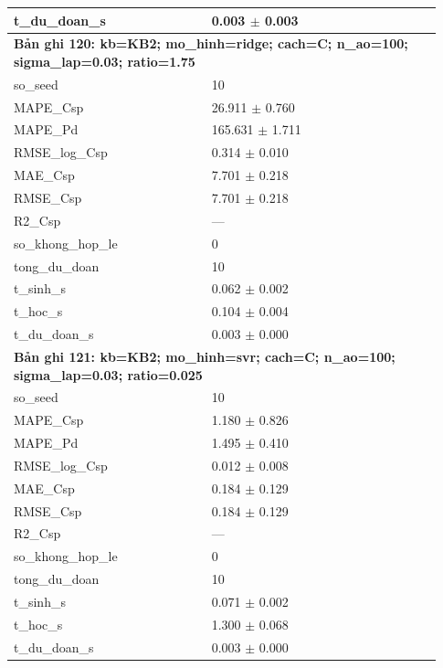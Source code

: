 \begin{longtable}{p{0.43\linewidth}p{0.50\linewidth}}
t\_\allowbreak du\_\allowbreak doan\_\allowbreak s & 0.003 $\pm$ 0.003 \\
\midrule
\multicolumn{2}{p{0.95\linewidth}}{\textbf{Bản ghi 120: kb=KB2; mo\_hinh=ridge; cach=C; n\_ao=100; sigma\_lap=0.03; ratio=1.75}} \\
so\_\allowbreak seed & 10 \\
MAPE\_\allowbreak Csp & 26.911 $\pm$ 0.760 \\
MAPE\_\allowbreak Pd & 165.631 $\pm$ 1.711 \\
RMSE\_\allowbreak log\_\allowbreak Csp & 0.314 $\pm$ 0.010 \\
MAE\_\allowbreak Csp & 7.701 $\pm$ 0.218 \\
RMSE\_\allowbreak Csp & 7.701 $\pm$ 0.218 \\
R2\_\allowbreak Csp & — \\
so\_\allowbreak khong\_\allowbreak hop\_\allowbreak le & 0 \\
tong\_\allowbreak du\_\allowbreak doan & 10 \\
t\_\allowbreak sinh\_\allowbreak s & 0.062 $\pm$ 0.002 \\
t\_\allowbreak hoc\_\allowbreak s & 0.104 $\pm$ 0.004 \\
t\_\allowbreak du\_\allowbreak doan\_\allowbreak s & 0.003 $\pm$ 0.000 \\
\midrule
\multicolumn{2}{p{0.95\linewidth}}{\textbf{Bản ghi 121: kb=KB2; mo\_hinh=svr; cach=C; n\_ao=100; sigma\_lap=0.03; ratio=0.025}} \\
so\_\allowbreak seed & 10 \\
MAPE\_\allowbreak Csp & 1.180 $\pm$ 0.826 \\
MAPE\_\allowbreak Pd & 1.495 $\pm$ 0.410 \\
RMSE\_\allowbreak log\_\allowbreak Csp & 0.012 $\pm$ 0.008 \\
MAE\_\allowbreak Csp & 0.184 $\pm$ 0.129 \\
RMSE\_\allowbreak Csp & 0.184 $\pm$ 0.129 \\
R2\_\allowbreak Csp & — \\
so\_\allowbreak khong\_\allowbreak hop\_\allowbreak le & 0 \\
tong\_\allowbreak du\_\allowbreak doan & 10 \\
t\_\allowbreak sinh\_\allowbreak s & 0.071 $\pm$ 0.002 \\
t\_\allowbreak hoc\_\allowbreak s & 1.300 $\pm$ 0.068 \\
t\_\allowbreak du\_\allowbreak doan\_\allowbreak s & 0.003 $\pm$ 0.000 \\

\end{longtable}

